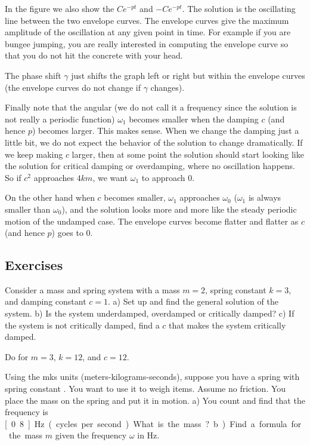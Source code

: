 \documentclass[12pt]{book}
\begin{document}
In the figure
we also show the \emph{}
$C e^{-pt}$ and $-C e^{-pt}$.  The solution
is the oscillating line between the two envelope curves.
The envelope curves give
the maximum amplitude of the oscillation at any given point in time.  For
example if you are bungee jumping, you are really interested in computing the
envelope curve so that you do not hit the concrete with your head.

The phase shift $\gamma$ just shifts the graph left or right but within the
envelope curves (the envelope curves do not change if $\gamma$
changes).

Finally note that the angular \emph{}
(we do not call it a frequency
since the solution is not really a periodic function) $\omega_1$ becomes
smaller when the damping $c$ (and hence $p$) becomes larger.  This makes sense.
When we change the damping just a little bit, we do not
expect the behavior of the solution to change dramatically.
If we keep making $c$ larger, then
at some point the solution should start looking 
like the solution for critical damping or overdamping, where no oscillation
happens.  So if $c^2$ approaches $4km$, we want $\omega_1$ to approach 0.

On the other hand when $c$ becomes smaller, $\omega_1$ approaches $\omega_0$
($\omega_1$ is always smaller than $\omega_0$), and the solution looks more and more like the steady
periodic motion of the undamped case.  The envelope curves become flatter and
flatter as $c$ (and hence $p$) goes to 0.

\subsection{Exercises}

\begin{exercise} \label{mv:ex1}
Consider a mass and spring system with a mass $m=2$, spring constant $k=3$, and
damping constant $c=1$.
a) Set up and find the general solution of the system.
b) Is the system underdamped, overdamped or critically damped?
c) If the system is not critically damped, find a $c$ that makes the system
critically damped.
\end{exercise}

\begin{exercise}
Do  for
$m=3$, $k=12$, and $c=12$.
\end{exercise}

\begin{exercise} \label{mv:exwt1}
Using the mks units (meters-kilograms-seconds),
suppose you have a spring with spring constant .
You want to use
it to weigh items.  Assume no friction.  You place the mass on
the spring and put it in motion.
a) You count and find that the frequency is
\unit[0.8]{Hz} (cycles per second).  What is the mass?
b) Find a formula for the mass $m$
given the frequency $\omega$ in \unit{Hz}.
\end{exercise}
\end{document}
